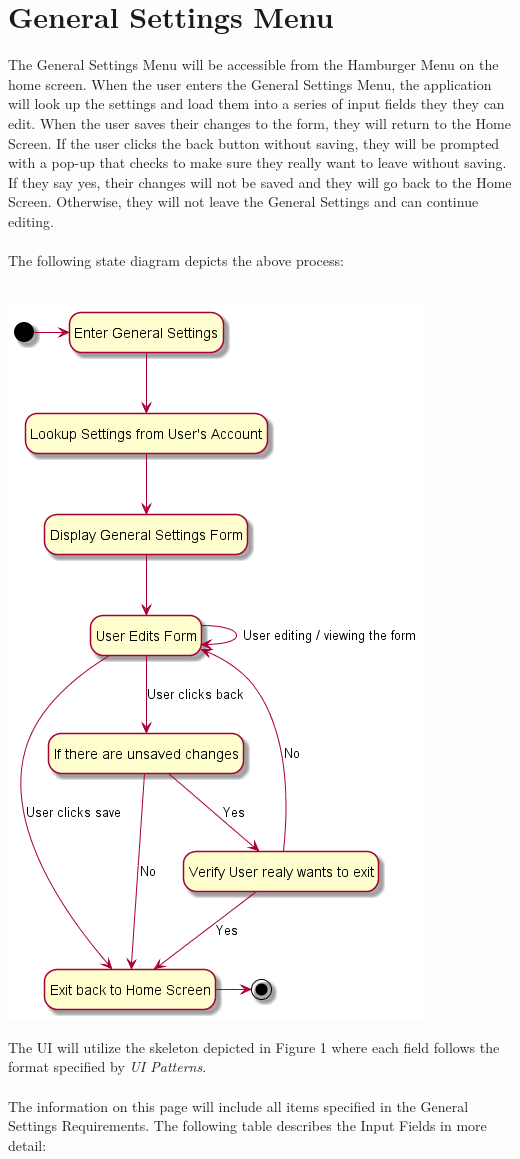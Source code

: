 \documentclass{scrreprt}
\begin{document}
\section{General Settings Menu}

The General Settings Menu will be accessible from the Hamburger Menu on the home screen.  When the user enters the General Settings Menu, the application will look up the settings and load them into a series of input fields they they can edit.  When the user saves their changes to the form, they will return to the Home Screen.  If the user clicks the back button without saving, they will be prompted with a pop-up that checks to make sure they really want to leave without saving.  If they say yes, their changes will not be saved and they will go back to the Home Screen.  Otherwise, they will not leave the General Settings and can continue editing.
\\\\
The following state diagram depicts the above process:
\\\\
\begin{center}
\includegraphics[scale=0.5]{settings.png}
\end{center}
The UI will utilize the skeleton depicted in Figure 1 where each field follows the format specified by \textit{UI Patterns}.
\\\\
The information on this page will include all items specified in the General Settings Requirements.  The following table describes the Input Fields in more detail:
\end{document}
